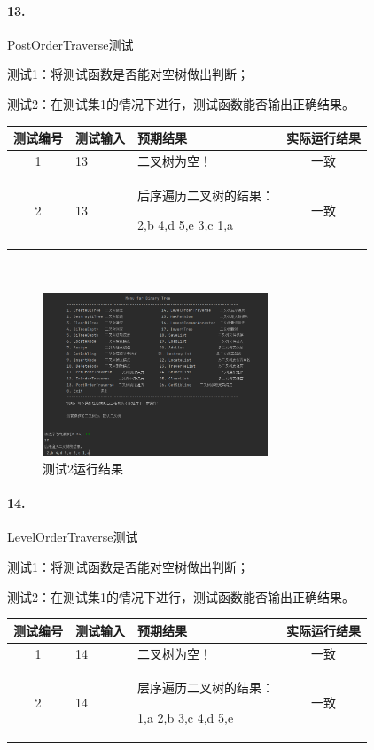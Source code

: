 \documentclass[supercite]{Experimental_Report}
\theoremstyle{definition}
\begin{document}
\paragraph{13.}PostOrderTraverse测试

测试1：将测试函数是否能对空树做出判断；

测试2：在测试集1的情况下进行，测试函数能否输出正确结果。

\vspace{0.5em}

\begin{tabular}{|c|p{2.7cm}|p{4.5cm}|c|}
	\hline
	测试编号 & 测试输入 & 预期结果 & 实际运行结果 \\
	\hline
	1 & 13 & 二叉树为空！ & 一致 \\
	\hline
	2 & 13 & 后序遍历二叉树的结果：
 
2,b 4,d 5,e 3,c 1,a & 一致 \\
	\hline
\end{tabular}

~\

\begin{figure}[H]
 	\centering
 	\includegraphics[width=0.6\textwidth]{images/二叉树测试13.png}
 	\caption{测试2运行结果}
 	\label{txlab}
 \end{figure}

\paragraph{14.}LevelOrderTraverse测试

测试1：将测试函数是否能对空树做出判断；

测试2：在测试集1的情况下进行，测试函数能否输出正确结果。

\vspace{0.5em}

\begin{tabular}{|c|p{2.7cm}|p{4.5cm}|c|}
	\hline
	测试编号 & 测试输入 & 预期结果 & 实际运行结果 \\
	\hline
	1 & 14 & 二叉树为空！ & 一致 \\
	\hline
	2 & 14 & 层序遍历二叉树的结果：

 1,a 2,b 3,c 4,d 5,e & 一致 \\
	\hline
\end{tabular}
\end{document}

